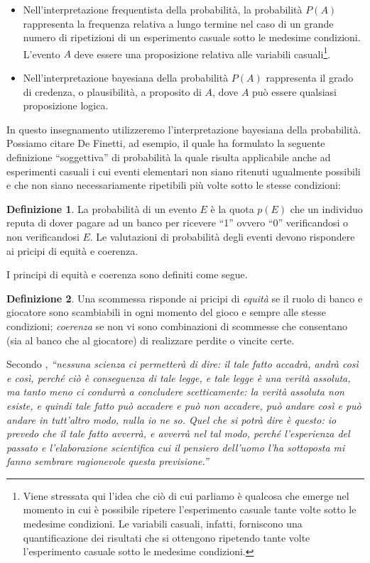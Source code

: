 \documentclass[
  11pt,
]{krantz}
\providecommand{\tightlist}{%
  \setlength{\itemsep}{0pt}\setlength{\parskip}{0pt}}
\theoremstyle{definition}
\newtheorem{definition}{Definizione}[chapter]
\theoremstyle{definition}
\theoremstyle{definition}
\theoremstyle{definition}
\theoremstyle{remark}
\begin{document}
\begin{itemize}
\tightlist
\item
  Nell'interpretazione frequentista della probabilità, la probabilità \(P(A)\) rappresenta la frequenza relativa a lungo termine nel caso di un grande numero di ripetizioni di un esperimento casuale sotto le medesime condizioni. L'evento \(A\) deve essere una proposizione relativa alle variabili casuali\footnote{Viene stressata qui l'idea che ciò di cui parliamo è qualcosa che emerge nel momento in cui è possibile ripetere l'esperimento casuale tante volte sotto le medesime condizioni. Le variabili casuali, infatti, forniscono una quantificazione dei risultati che si ottengono ripetendo tante volte l'esperimento casuale sotto le medesime condizioni.}.
\item
  Nell'interpretazione bayesiana della probabilità \(P(A)\) rappresenta il grado di credenza, o plausibilità, a proposito di \(A\), dove \(A\) può essere qualsiasi proposizione logica.
\end{itemize}

In questo insegnamento utilizzeremo l'interpretazione bayesiana della probabilità. Possiamo citare De Finetti, ad esempio, il quale ha formulato la seguente definizione ``soggettiva'' di probabilità la quale risulta applicabile anche ad esperimenti casuali i cui eventi elementari non siano ritenuti ugualmente possibili e che non siano necessariamente ripetibili più volte sotto le stesse condizioni:

\begin{definition}
La probabilità di un evento \(E\) è la quota \(p(E)\) che un individuo reputa di dover pagare ad un banco per ricevere ``1'' ovvero ``0'' verificandosi o non verificandosi \(E\). Le valutazioni di probabilità degli eventi devono rispondere ai pricipi di equità e coerenza.
\end{definition}

I principi di equità e coerenza sono definiti come segue.

\begin{definition}
Una scommessa risponde ai pricipi di \emph{equità} se il ruolo di banco e giocatore sono scambiabili in ogni momento del gioco e sempre alle stesse condizioni; \emph{coerenza} se non vi sono combinazioni di scommesse che consentano (sia al banco che al giocatore) di realizzare perdite o vincite certe.
\end{definition}

Secondo \citet{definetti1931prob}, \emph{``nessuna scienza ci permetterà di dire: il tale fatto accadrà, andrà così e così, perché ciò è conseguenza di tale legge, e tale legge è una verità assoluta, ma tanto meno ci condurrà a concludere scetticamente: la verità assoluta non esiste, e quindi tale fatto può accadere e può non accadere, può andare così e può andare in tutt'altro modo, nulla io ne so. Quel che si potrà dire è questo: io prevedo che il tale fatto avverrà, e avverrà nel tal modo, perché l'esperienza del passato e l'elaborazione scientifica cui il pensiero dell'uomo l'ha sottoposta mi fanno sembrare ragionevole questa previsione.''}
\end{document}
